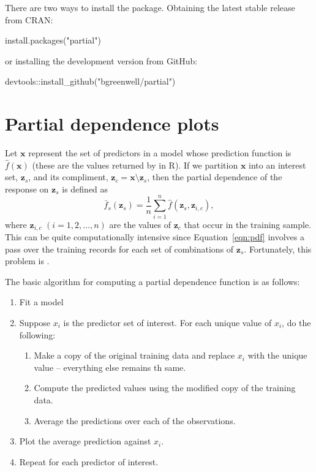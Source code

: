 There are two ways to install the  package. Obtaining the latest stable release from CRAN:
\begin{example}
install.packages("partial")
\end{example}
or installing the development version from GitHub:
\begin{example}
devtools::install_github("bgreenwell/partial")
\end{example}

\section{Partial dependence plots}

Let $\boldsymbol{x}$ represent the set of predictors in a model whose prediction function is $\widehat{f}\left(\boldsymbol{x}\right)$ (these are the values returned by  in R). If we partition $\boldsymbol{x}$ into an interest set, $\boldsymbol{z}_s$, and its compliment, $\boldsymbol{z}_{c} = \boldsymbol{x} \setminus \boldsymbol{z}_s$, then the partial dependence of the response on $\boldsymbol{z}_s$ is defined as
\begin{equation}
\label{eqn:pdf}
\bar{f}_s\left(\boldsymbol{z}_s\right) = \frac{1}{n}\sum_{i = 1}^n\widehat{f}\left(\boldsymbol{z}_s,\boldsymbol{z}_{i, c}\right),
\end{equation}
where $\boldsymbol{z}_{i, c}$ $\left(i = 1, 2, \dots, n\right)$ are the values of $\boldsymbol{z}_c$ that occur in the training sample. This can be quite computationally intensive since Equation~\eqref{eqn:pdf} involves a pass over the training records for each set of combinations of $\boldsymbol{z}_s$. Fortunately, this problem is .

The basic algorithm for computing a partial dependence function is as follows:
\begin{enumerate}
  \item Fit a model
  \item Suppose $x_i$ is the predictor set of interest. For each unique value of $x_i$, do the following:
  \begin{enumerate}
    \item Make a copy of the original training data and replace $x_i$ with the unique value -- everything else remains th same.
    \item Compute the predicted values using the modified copy of the training data.
    \item Average the predictions over each of the observations.
  \end{enumerate}
  \item Plot the average prediction against $x_i$.
  \item Repeat for each predictor of interest.
\end{enumerate}


